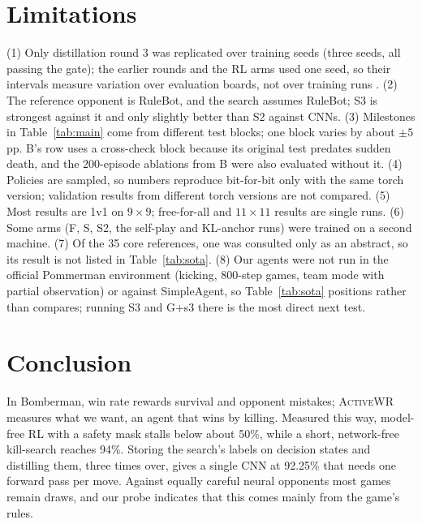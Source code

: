 \documentclass[11pt]{article}
\newcommand{\awr}{\textsc{ActiveWR}}
\newcommand{\pp}{\,pp}
\begin{document}
\section{Limitations}
(1) Only distillation round 3 was replicated over training seeds (three seeds, all passing the gate); the earlier rounds and the RL arms used one seed, so their intervals measure variation over evaluation boards, not over training runs \cite{henderson2018matters,agarwal2021precipice}. (2) The reference opponent is RuleBot, and the search assumes RuleBot; S3 is strongest against it and only slightly better than S2 against CNNs. (3) Milestones in Table~\ref{tab:main} come from different test blocks; one block varies by about $\pm5$\pp{}. B's row uses a cross-check block because its original test predates sudden death, and the 200-episode ablations from B were also evaluated without it. (4) Policies are sampled, so numbers reproduce bit-for-bit only with the same torch version; validation results from different torch versions are not compared. (5) Most results are 1v1 on $9\times9$; free-for-all and $11\times11$ results are single runs. (6) Some arms (F, S, S2, the self-play and KL-anchor runs) were trained on a second machine. (7) Of the 35 core references, one \cite{goulart2019} was consulted only as an abstract, so its result is not listed in Table~\ref{tab:sota}. (8) Our agents were not run in the official Pommerman environment (kicking, 800-step games, team mode with partial observation) or against SimpleAgent, so Table~\ref{tab:sota} positions rather than compares; running S3 and G+s3 there is the most direct next test.

\section{Conclusion}
In Bomberman, win rate rewards survival and opponent mistakes; \awr{} measures what we want, an agent that wins by killing. Measured this way, model-free RL with a safety mask stalls below about 50\%, while a short, network-free kill-search reaches 94\%. Storing the search's labels on decision states and distilling them, three times over, gives a single CNN at 92.25\% that needs one forward pass per move. Against equally careful neural opponents most games remain draws, and our probe indicates that this comes mainly from the game's rules.

\end{document}
